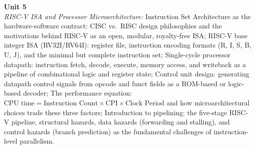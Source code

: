 \noindent\textbf{Unit 5} \\
\textit{RISC-V ISA and Processor Microarchitecture:} Instruction Set Architecture as the hardware-software contract: CISC vs.\ RISC design philosophies and the motivations behind RISC-V as an open, modular, royalty-free ISA; RISC-V base integer ISA (RV32I/RV64I): register file, instruction encoding formats (R, I, S, B, U, J), and the minimal but complete instruction set; Single-cycle processor datapath: instruction fetch, decode, execute, memory access, and writeback as a pipeline of combinational logic and register state; Control unit design: generating datapath control signals from opcode and funct fields as a ROM-based or logic-based decoder; The performance equation: $\text{CPU time} = \text{Instruction Count} \times \text{CPI} \times \text{Clock Period}$ and how microarchitectural choices trade these three factors; Introduction to pipelining: the five-stage RISC-V pipeline, structural hazards, data hazards (forwarding and stalling), and control hazards (branch prediction) as the fundamental challenges of instruction-level parallelism.

\newpage
{}
